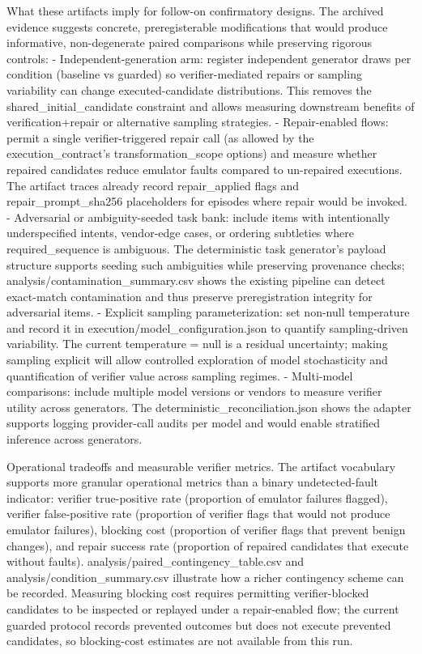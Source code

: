 \documentclass[conference]{IEEEtran}
\begin{document}
What these artifacts imply for follow-on confirmatory designs. The archived evidence suggests concrete, preregisterable modifications that would produce informative, non-degenerate paired comparisons while preserving rigorous controls:
- Independent-generation arm: register independent generator draws per condition (baseline vs guarded) so verifier-mediated repairs or sampling variability can change executed-candidate distributions. This removes the shared\_initial\_candidate constraint and allows measuring downstream benefits of verification+repair or alternative sampling strategies.
- Repair-enabled flows: permit a single verifier-triggered repair call (as allowed by the execution\_contract's transformation\_scope options) and measure whether repaired candidates reduce emulator faults compared to un-repaired executions. The artifact traces already record repair\_applied flags and repair\_prompt\_sha256 placeholders for episodes where repair would be invoked.
- Adversarial or ambiguity-seeded task bank: include items with intentionally underspecified intents, vendor-edge cases, or ordering subtleties where required\_sequence is ambiguous. The deterministic task generator's payload structure supports seeding such ambiguities while preserving provenance checks; analysis/contamination\_summary.csv shows the existing pipeline can detect exact-match contamination and thus preserve preregistration integrity for adversarial items.
- Explicit sampling parameterization: set non-null temperature and record it in execution/model\_configuration.json to quantify sampling-driven variability. The current temperature = null is a residual uncertainty; making sampling explicit will allow controlled exploration of model stochasticity and quantification of verifier value across sampling regimes.
- Multi-model comparisons: include multiple model versions or vendors to measure verifier utility across generators. The deterministic\_reconciliation.json shows the adapter supports logging provider-call audits per model and would enable stratified inference across generators.

Operational tradeoffs and measurable verifier metrics. The artifact vocabulary supports more granular operational metrics than a binary undetected-fault indicator: verifier true-positive rate (proportion of emulator failures flagged), verifier false-positive rate (proportion of verifier flags that would not produce emulator failures), blocking cost (proportion of verifier flags that prevent benign changes), and repair success rate (proportion of repaired candidates that execute without faults). analysis/paired\_contingency\_table.csv and analysis/condition\_summary.csv illustrate how a richer contingency scheme can be recorded. Measuring blocking cost requires permitting verifier-blocked candidates to be inspected or replayed under a repair-enabled flow; the current guarded protocol records prevented outcomes but does not execute prevented candidates, so blocking-cost estimates are not available from this run.
\end{document}
